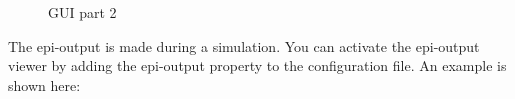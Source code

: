 \begin{center}
	\begin{figure}[hbtp!]
		\caption{GUI part 2} \label{gui2}
	\end{figure}
\end{center}

\newpage

The epi-output is made during a simulation. You can activate the epi-output viewer by adding the epi-output property to the configuration file. An example is shown here:

